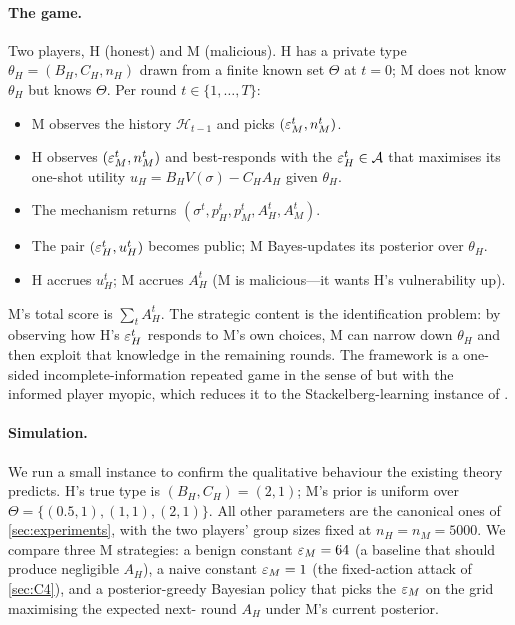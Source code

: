 \paragraph{The game.}
Two players, H (honest) and M (malicious). H has a private type
$\theta_H = (B_H, C_H, n_H)$ drawn from a finite known set $\Theta$ at
$t=0$; M does not know $\theta_H$ but knows $\Theta$. Per round $t \in
\{1,\dots,T\}$:
\begin{itemize}
\item M observes the history $\mathcal{H}_{t-1}$ and picks
$(\varepsilon_M^t, n_M^t)$.
\item H observes $(\varepsilon_M^t, n_M^t)$ and best-responds with the
$\varepsilon_H^t \in \mathcal{A}$ that maximises its one-shot utility
$u_H = B_H V(\sigma) - C_H A_H$ given $\theta_H$.
\item The mechanism returns $(\sigma^t, p_H^t, p_M^t, A_H^t, A_M^t)$.
\item The pair $(\varepsilon_H^t, u_H^t)$ becomes public; M Bayes-updates its
posterior over $\theta_H$.
\item H accrues $u_H^t$; M accrues $A_H^t$ (M is malicious---it wants
H's vulnerability up).
\end{itemize}
M's total score is $\sum_t A_H^t$. The strategic content is the
identification problem: by observing how H's $\varepsilon_H^t$ responds to M's
own choices, M can narrow down $\theta_H$ and then exploit that knowledge
in the remaining rounds. The framework is a one-sided
incomplete-information repeated game in the sense of
\citet{aumann1995repeated} but with the informed player myopic, which
reduces it to the Stackelberg-learning instance of
\citet{letchford2009learning}.

\paragraph{Simulation.}
We run a small instance to confirm the qualitative behaviour the existing
theory predicts. H's true type is $(B_H, C_H) = (2, 1)$; M's prior is
uniform over $\Theta = \{(0.5, 1), (1, 1), (2, 1)\}$. All other
parameters are the canonical ones of \cref{sec:experiments}, with the
two players' group sizes fixed at $n_H = n_M = 5000$. We compare three
M strategies: a benign constant $\varepsilon_M = 64$ (a baseline that should
produce negligible $A_H$), a naive constant $\varepsilon_M = 1$ (the
fixed-action attack of \cref{sec:C4}), and a posterior-greedy Bayesian
policy that picks the $\varepsilon_M$ on the grid maximising the expected next-
round $A_H$ under M's current posterior.

